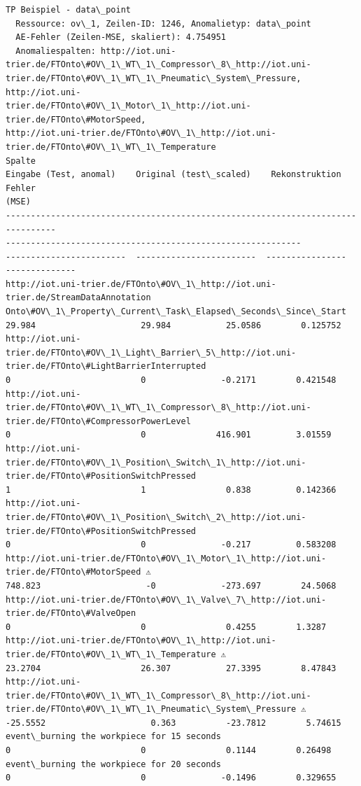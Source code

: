 \documentclass[11pt]{article}
\begin{document}
\begin{Verbatim}[commandchars=\\\{\}]
TP Beispiel - data\_point
  Ressource: ov\_1, Zeilen-ID: 1246, Anomalietyp: data\_point
  AE-Fehler (Zeilen-MSE, skaliert): 4.754951
  Anomaliespalten: http://iot.uni-
trier.de/FTOnto\#OV\_1\_WT\_1\_Compressor\_8\_http://iot.uni-
trier.de/FTOnto\#OV\_1\_WT\_1\_Pneumatic\_System\_Pressure, http://iot.uni-
trier.de/FTOnto\#OV\_1\_Motor\_1\_http://iot.uni-trier.de/FTOnto\#MotorSpeed,
http://iot.uni-trier.de/FTOnto\#OV\_1\_http://iot.uni-
trier.de/FTOnto\#OV\_1\_WT\_1\_Temperature
Spalte
Eingabe (Test, anomal)    Original (test\_scaled)    Rekonstruktion    Fehler
(MSE)
--------------------------------------------------------------------------------
-----------------------------------------------------------
------------------------  ------------------------  ----------------
--------------
http://iot.uni-trier.de/FTOnto\#OV\_1\_http://iot.uni-trier.de/StreamDataAnnotation
Onto\#OV\_1\_Property\_Current\_Task\_Elapsed\_Seconds\_Since\_Start
29.984                     29.984           25.0586        0.125752
http://iot.uni-trier.de/FTOnto\#OV\_1\_Light\_Barrier\_5\_http://iot.uni-
trier.de/FTOnto\#LightBarrierInterrupted
0                          0               -0.2171        0.421548
http://iot.uni-trier.de/FTOnto\#OV\_1\_WT\_1\_Compressor\_8\_http://iot.uni-
trier.de/FTOnto\#CompressorPowerLevel
0                          0              416.901         3.01559
http://iot.uni-trier.de/FTOnto\#OV\_1\_Position\_Switch\_1\_http://iot.uni-
trier.de/FTOnto\#PositionSwitchPressed
1                          1                0.838         0.142366
http://iot.uni-trier.de/FTOnto\#OV\_1\_Position\_Switch\_2\_http://iot.uni-
trier.de/FTOnto\#PositionSwitchPressed
0                          0               -0.217         0.583208
http://iot.uni-trier.de/FTOnto\#OV\_1\_Motor\_1\_http://iot.uni-
trier.de/FTOnto\#MotorSpeed ⚠
748.823                     -0             -273.697        24.5068
http://iot.uni-trier.de/FTOnto\#OV\_1\_Valve\_7\_http://iot.uni-
trier.de/FTOnto\#ValveOpen
0                          0                0.4255        1.3287
http://iot.uni-trier.de/FTOnto\#OV\_1\_http://iot.uni-
trier.de/FTOnto\#OV\_1\_WT\_1\_Temperature ⚠
23.2704                    26.307           27.3395        8.47843
http://iot.uni-trier.de/FTOnto\#OV\_1\_WT\_1\_Compressor\_8\_http://iot.uni-
trier.de/FTOnto\#OV\_1\_WT\_1\_Pneumatic\_System\_Pressure ⚠
-25.5552                     0.363          -23.7812        5.74615
event\_burning the workpiece for 15 seconds
0                          0                0.1144        0.26498
event\_burning the workpiece for 20 seconds
0                          0               -0.1496        0.329655

\end{Verbatim}
\end{document}
